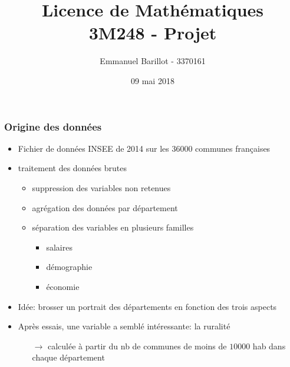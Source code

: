 \documentclass{beamer}
\title{Licence de Mathématiques \\3M248 - Projet}
\author{Emmanuel Barillot - 3370161}
\date{09 mai 2018}
\begin{document}
\begin{frame}
\titlepage
\end{frame}


\begin{frame}
	\frametitle{Origine des données}
	\begin{itemize}
		\item Fichier de données INSEE de 2014 sur les 36000 communes françaises
		\item traitement des données brutes
		\begin{itemize}
			\item suppression des variables non retenues
			\item agrégation des données par département
			\item séparation des variables en plusieurs familles
			\begin{itemize}
				\item salaires
				\item démographie
				\item économie
			\end{itemize}
		\end{itemize}

		\item Idée: brosser un portrait des départements en fonction des trois aspects
		\item Après essais, une variable a semblé intéressante: la ruralité
			\begin{itemize}
				\item[$\rightarrow$] calculée à partir du nb de communes de moins de $10000$ hab dans chaque département
			\end{itemize}
	\end{itemize}
\end{frame}
\end{document}
